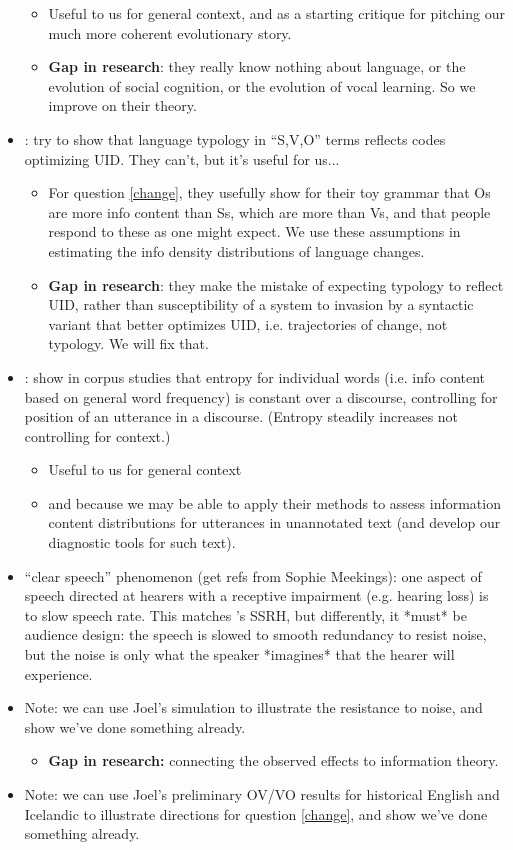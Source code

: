 \documentclass[11pt]{article}
\begin{document}
\begin{itemize}
	\begin{itemize}
		\item Useful to us for general context, and as a starting critique for pitching our much more coherent evolutionary story.
		\item \textbf{Gap in research}: they really know nothing about language, or the evolution of social cognition, or the evolution of vocal learning. So we improve on their theory.
	\end{itemize}
	\item \citet{mauritsetal2010}: try to show that language typology in ``S,V,O'' terms reflects codes optimizing UID. They can't, but it's useful for us...
	\begin{itemize}
		\item For question \ref{change}, they usefully show for their toy grammar that Os are more info content than Ss, which are more than Vs, and that people respond to these as one might expect. We use these assumptions in estimating the info density distributions of language changes.
		\item \textbf{Gap in research}: they make the mistake of expecting typology to reflect UID, rather than susceptibility of a system to invasion by a syntactic variant that better optimizes UID, i.e. trajectories of change, not typology. We will fix that.
	\end{itemize}
	\item \citet{genzelcharniak2002}: show in corpus studies that entropy for individual words (i.e. info content based on general word frequency) is constant over a discourse, controlling for position of an utterance in a discourse. (Entropy steadily increases not controlling for context.) 
	\begin{itemize}
		\item Useful to us for general context
		\item and because we may be able to apply their methods to assess information content distributions for utterances in unannotated text (and develop our diagnostic tools for such text).
	\end{itemize}
	\item ``clear speech'' phenomenon (get refs from Sophie Meekings): one aspect of speech directed at hearers with a receptive impairment (e.g. hearing loss) is to slow speech rate. This matches \citet{aylettturk2004}'s SSRH, but differently, it *must* be audience design: the speech is slowed to smooth redundancy to resist noise, but the noise is only what the speaker *imagines* that the hearer will experience.
	\item Note: we can use Joel's simulation to illustrate the resistance to noise, and show we've done something already. 
	\begin{itemize}
		\item \textbf{Gap in research:} connecting the observed effects to information theory.
	\end{itemize}
	\item Note: we can use Joel's preliminary OV/VO results for historical English and Icelandic to illustrate directions for question \ref{change}, and show we've done something already.
\end{itemize}
\end{document}
